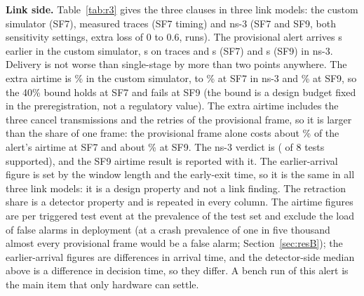 \documentclass{ieeeaccess}
\begin{document}
\textbf{Link side.} Table~\ref{tab:r3} gives the three clauses in three link models: the custom simulator (SF7), measured traces (SF7 timing) and ns-3 (SF7 and SF9, both sensitivity settings, extra loss of 0 to 0.6, \NsRuns{} runs). The provisional alert arrives \RThreeEarly{} s earlier in the custom simulator, \TOneEarlier{} s on traces and \NsEarlySfSeven{} s (SF7) and \NsEarlySfNine{} s (SF9) in ns-3. Delivery is not worse than single-stage by more than two points anywhere. The extra airtime is \RThreeAir\% in the custom simulator, \NsAirLoSfSeven{} to \NsAirHiSfSeven\% at SF7 in ns-3 and \NsAirHiSfNine\% at SF9, so the 40\% bound holds at SF7 and fails at SF9 (the bound is a design budget fixed in the preregistration, not a regulatory value). The extra airtime includes the three cancel transmissions and the retries of the provisional frame, so it is larger than the share of one frame: the provisional frame alone costs about \FlashShareSeven\% of the alert's airtime at SF7 and about \FlashShareNine\% at SF9. The ns-3 verdict is \NsVerdict{} (\NsSupported{} of 8 tests supported), and the SF9 airtime result is reported with it. The earlier-arrival figure is set by the window length and the early-exit time, so it is the same in all three link models: it is a design property and not a link finding. The retraction share is a detector property and is repeated in every column. The airtime figures are per triggered test event at the prevalence of the test set and exclude the load of false alarms in deployment (at a crash prevalence of one in five thousand almost every provisional frame would be a false alarm; Section~\ref{sec:resB}); the earlier-arrival figures are differences in arrival time, and the detector-side median above is a difference in decision time, so they differ. A bench run of this alert is the main item that only hardware can settle.
\end{document}
